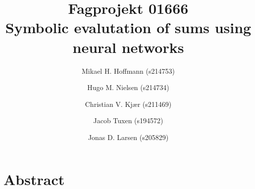 \documentclass{article}
\title{
    Fagprojekt 01666 \\
    \large{Symbolic evalutation of sums using neural networks}
}
\author{Mikael H. Hoffmann (s214753) \and Hugo M. Nielsen (s214734) \and Christian V. Kjær (s211469) \and Jacob Tuxen (s194572) \and Jonas D. Larsen (s205829)}
\date{}
\begin{document}
\maketitle

\section{Abstract}
\end{document}
